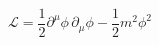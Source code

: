 \begin{equation}
\label{eq:1.50}
\mathcal{L} = \frac{1}{2}\partial^\mu\phi\,\partial_\mu\phi - \frac{1}{2} m^2\phi^2
\end{equation}